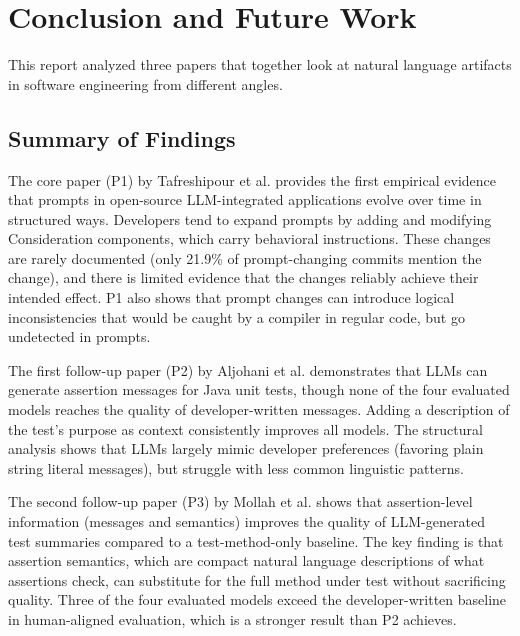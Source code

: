 \documentclass[
    pdftex,
    final,
    11pt,
    a4paper,
    parskip=false,
    oneside,
    footheight=0mm,
    footinclude=false,
    toc=bibliography
]{scrbook}
\begin{document}
\chapter{Conclusion and Future Work}
\label{ch:conclusion}

This report analyzed three papers that together look at natural language artifacts in software engineering from different angles.

\section{Summary of Findings}

The core paper (P1) by Tafreshipour et al. \cite{Tafreshipour2025} provides the first empirical evidence that prompts in open-source LLM-integrated applications evolve over time in structured ways. Developers tend to expand prompts by adding and modifying Consideration components, which carry behavioral instructions. These changes are rarely documented (only 21.9\% of prompt-changing commits mention the change), and there is limited evidence that the changes reliably achieve their intended effect. P1 also shows that prompt changes can introduce logical inconsistencies that would be caught by a compiler in regular code, but go undetected in prompts.

The first follow-up paper (P2) by Aljohani et al. \cite{Aljohani2025} demonstrates that LLMs can generate assertion messages for Java unit tests, though none of the four evaluated models reaches the quality of developer-written messages. Adding a description of the test's purpose as context consistently improves all models. The structural analysis shows that LLMs largely mimic developer preferences (favoring plain string literal messages), but struggle with less common linguistic patterns.

The second follow-up paper (P3) by Mollah et al. \cite{Mollah2025} shows that assertion-level information (messages and semantics) improves the quality of LLM-generated test summaries compared to a test-method-only baseline. The key finding is that assertion semantics, which are compact natural language descriptions of what assertions check, can substitute for the full method under test without sacrificing quality. Three of the four evaluated models exceed the developer-written baseline in human-aligned evaluation, which is a stronger result than P2 achieves.
\end{document}
